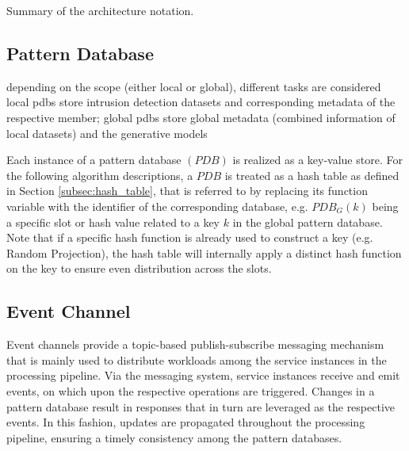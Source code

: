     \begin{table}[b]
        \centering
        
        \caption{Summary of the architecture notation.}
    \end{table}

\subsection{Pattern Database} \label{subsec:pattern_database}

depending on the scope (either local or global), different tasks are considered
local pdbs store intrusion detection datasets and corresponding metadata of the respective member; 
global pdbs store global metadata (combined information of local datasets) and the generative models


Each instance of a pattern database $(PDB)$ is realized as a key-value store. For the following algorithm descriptions, a $PDB$ is treated as a hash table as defined in Section \ref{subsec:hash_table}, that is referred to by replacing its function variable with the identifier of the corresponding database, e.g. $PDB_G(k)$ being a specific slot or hash value related to a key $k$ in the global pattern database. Note that if a specific hash function is already used to construct a key (e.g. Random Projection), the hash table will internally apply a distinct hash function on the key to ensure even distribution across the slots.

\subsection{Event Channel} \label{subsec:event_channel}
Event channels provide a topic-based publish-subscribe messaging mechanism that is mainly used to distribute workloads among the service instances in the processing pipeline. Via the messaging system, service instances receive and emit events, on which upon the respective operations are triggered. Changes in a pattern database result in responses that in turn are leveraged as the respective events. In this fashion, updates are propagated throughout the processing pipeline, ensuring a timely consistency among the pattern databases.




